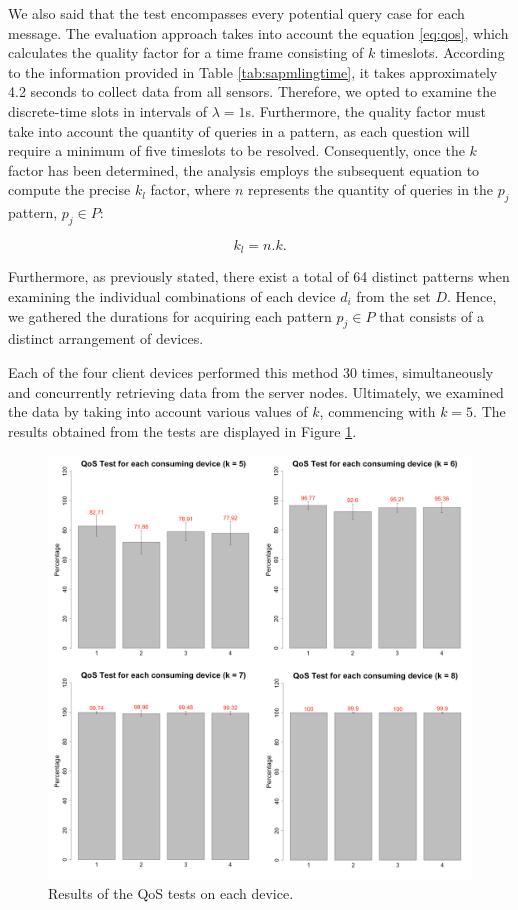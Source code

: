 We also said that the test encompasses every potential query case for each message. The evaluation approach takes into account the equation \ref{eq:qos}, which calculates the quality factor for a time frame consisting of $k$ timeslots. According to the information provided in Table \ref{tab:sapmlingtime}, it takes approximately 4.2 seconds to collect data from all sensors. Therefore, we opted to examine the discrete-time slots in intervals of $\lambda = 1$s. Furthermore, the quality factor must take into account the quantity of queries in a pattern, as each question will require a minimum of five timeslots to be resolved. Consequently, once the $k$ factor has been determined, the analysis employs the subsequent equation to compute the precise $k_l$ factor, where $n$ represents the quantity of queries in the $p_j$ pattern, $p_j \in P$:


\begin{equation*}
    k_l = n.k.
\end{equation*}

Furthermore, as previously stated, there exist a total of 64 distinct patterns when examining the individual combinations of each device $d_i$ from the set $D$. Hence, we gathered the durations for acquiring each pattern $p_j \in P$ that consists of a distinct arrangement of devices. 

Each of the four client devices performed this method 30 times, simultaneously and concurrently retrieving data from the server nodes. Ultimately, we examined the data by taking into account various values of $k$, commencing with $k = 5$. The results obtained from the tests are displayed in Figure \ref{fig:QoSresults}.

\begin{figure}[!h]
    \centering
    \includegraphics[width = \linewidth]{Figures/QoS_tests_result.png}
    \caption{Results of the QoS tests on each device.}
    \label{fig:QoSresults}
\end{figure}

